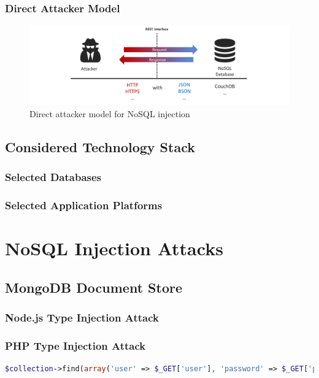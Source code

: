 
\subsection{Direct Attacker Model}

\begin{figure}[h]
\centering
  \includegraphics[width=1\linewidth]{Images/attacker_model_direct}
  \caption{Direct attacker model for NoSQL injection}
  \label{fig:extendedAttackerModel}
\end{figure}



\section{Considered Technology Stack}
\subsection{Selected Databases}
\subsection{Selected Application Platforms}


\chapter{NoSQL Injection Attacks}

\section{MongoDB Document Store}
\subsection{Node.js Type Injection Attack}
\subsection{PHP Type Injection Attack}

\begin{lstlisting}[caption={Vulnerable PHP - MongoDb application}, label={lst:PHPArrayInjection}, language=PHP]
$collection->find(array('user' => $_GET['user'], 'password' => $_GET['password']));
\end{lstlisting}


